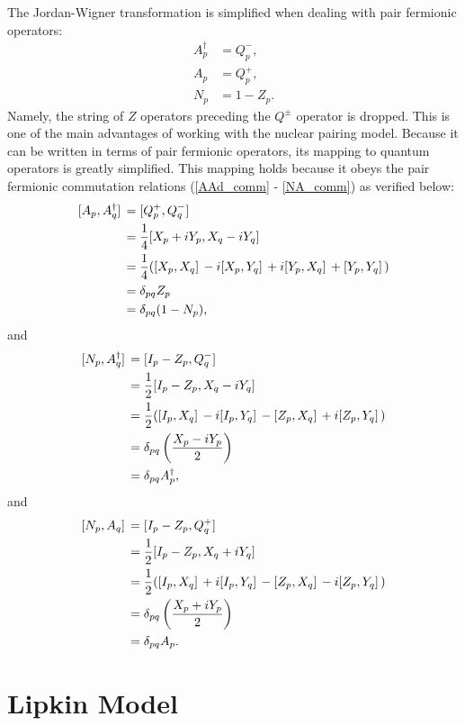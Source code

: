 \documentclass[Dual]{msu-thesis}
\begin{document}
The Jordan-Wigner transformation is simplified when dealing with pair fermionic operators:
\begin{align}
A^\dagger_p&=Q^-_p,
\\
A_p&=Q^+_p,
\\
N_p&=1-Z_p
.\end{align}
Namely, the string of $Z$ operators preceding the $Q^\pm$ operator is dropped. This is one of the main advantages of working with the nuclear pairing model. Because it can be written in terms of pair fermionic operators, its mapping to quantum operators is greatly simplified. This mapping holds because it obeys the pair fermionic commutation relations (\ref{AAd_comm} - \ref{NA_comm}) as verified below:
\begin{align}
\comm*{A_p}{A^\dagger_q}
&=
\comm*{Q^+_p}{Q^-_q}
\nonumber
\\
&=
\frac{1}{4}\comm*{X_p+iY_p}{X_q-iY_q}
\nonumber
\\
&=
\frac{1}{4}(\comm*{X_p}{X_q}-i\comm*{X_p}{Y_q}+i\comm*{Y_p}{X_q}+\comm*{Y_p}{Y_q})
\nonumber
\\
&=
\delta_{pq}Z_p
\nonumber
\\
&=
\delta_{pq}(1-N_p),
\end{align}
and
\begin{align}
\comm*{N_p}{A^\dagger_q}
&=
\comm*{I_p-Z_p}{Q^-_q}
\nonumber
\\
&=
\frac{1}{2}\comm*{I_p-Z_p}{X_q-iY_q}
\nonumber
\\
&=
\frac{1}{2}(\comm*{I_p}{X_q}-i\comm*{I_p}{Y_q}-\comm*{Z_p}{X_q}+i\comm*{Z_p}{Y_q})
\nonumber
\\
&=
\delta_{pq}\left(\frac{X_p-iY_p}{2}\right)
\nonumber
\\
&=
\delta_{pq}A^\dagger_p,
\end{align}
and
\begin{align}
\comm*{N_p}{A_q}
&=
\comm*{I_p-Z_p}{Q^+_q}
\nonumber
\\
&=
\frac{1}{2}\comm*{I_p-Z_p}{X_q+iY_q}
\nonumber
\\
&=
\frac{1}{2}(\comm*{I_p}{X_q}+i\comm*{I_p}{Y_q}-\comm*{Z_p}{X_q}-i\comm*{Z_p}{Y_q})
\nonumber
\\
&=
\delta_{pq}\left(\frac{X_p+iY_p}{2}\right)
\nonumber
\\
&=
\delta_{pq}A_p.
\end{align}

\chapter{Lipkin Model}
\label{chap:lipkin_model}
\end{document}
